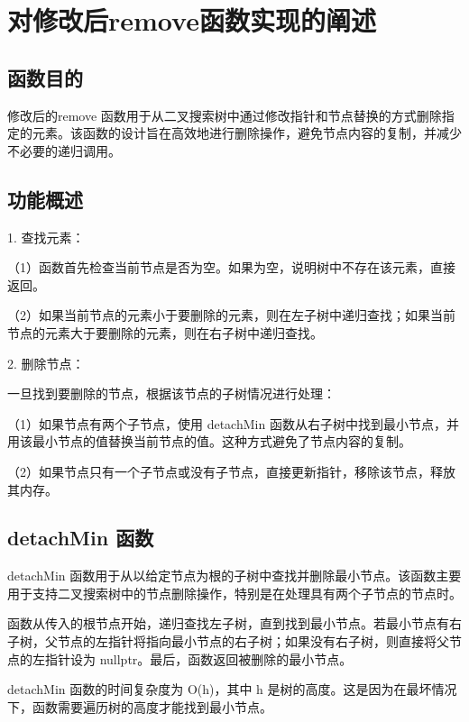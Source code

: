 \documentclass[UTF8]{ctexart}
\begin{document}
\pagestyle{fancy}
\fancyhead{}


\section{对修改后remove函数实现的阐述}  

\subsection{函数目的}
修改后的remove 函数用于从二叉搜索树中通过修改指针和节点替换的方式删除指定的元素。该函数的设计旨在高效地进行删除操作，避免节点内容的复制，并减少不必要的递归调用。

\subsection{功能概述}

1. 查找元素：

（1）函数首先检查当前节点是否为空。如果为空，说明树中不存在该元素，直接返回。

（2）如果当前节点的元素小于要删除的元素，则在左子树中递归查找；如果当前节点的元素大于要删除的元素，则在右子树中递归查找。

2.  删除节点：

一旦找到要删除的节点，根据该节点的子树情况进行处理：

（1）如果节点有两个子节点，使用 detachMin 函数从右子树中找到最小节点，并用该最小节点的值替换当前节点的值。这种方式避免了节点内容的复制。

（2）如果节点只有一个子节点或没有子节点，直接更新指针，移除该节点，释放其内存。

\subsection{detachMin 函数}

detachMin 函数用于从以给定节点为根的子树中查找并删除最小节点。该函数主要用于支持二叉搜索树中的节点删除操作，特别是在处理具有两个子节点的节点时。

函数从传入的根节点开始，递归查找左子树，直到找到最小节点。若最小节点有右子树，父节点的左指针将指向最小节点的右子树；如果没有右子树，则直接将父节点的左指针设为 nullptr。最后，函数返回被删除的最小节点。

detachMin 函数的时间复杂度为 O(h)，其中 h 是树的高度。这是因为在最坏情况下，函数需要遍历树的高度才能找到最小节点。
\end{document}
